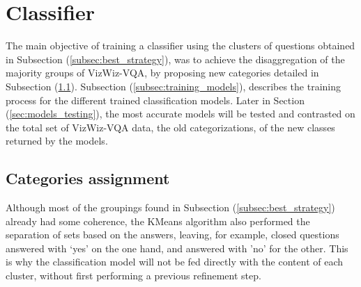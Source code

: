 \section{Classifier}
\label{sec:classifier}
The main objective of training a classifier using the clusters of questions obtained in Subsection (\ref{subsec:best_strategy}), was to achieve the disaggregation of the majority groups of VizWiz-VQA, by proposing new categories detailed in Subsection (\ref{subsec:categories_assignment}).
Subsection (\ref{subsec:training_models}), describes the training process for the different trained classification models. Later in Section (\ref{sec:models_testing}), the most accurate models will be tested and contrasted on the total set of VizWiz-VQA data, the old categorizations, of the new classes returned by the models.

\subsection{Categories assignment}
\label{subsec:categories_assignment}
Although most of the groupings found in Subsection (\ref{subsec:best_strategy}) already had some coherence, the KMeans algorithm also performed the separation of sets based on the answers, leaving, for example, closed questions answered with `yes' on the one hand, and answered with 'no' for the other. This is why the classification model will not be fed directly with the content of each cluster, without first performing a previous refinement step.

